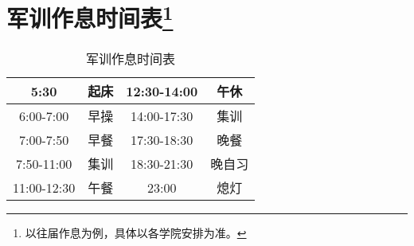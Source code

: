 \section[军训作息时间表]{军训作息时间表\footnote{以往届作息为例，具体以各学院安排为准。}}
\begin{table}[ht]
    \centering
    \begin{tabular}{|c|c|c|c|}
        \hline
        5:30        & 起床 & 12:30-14:00 & 午休  \\
        \hline
        6:00-7:00   & 早操 & 14:00-17:30 & 集训  \\
        \hline
        7:00-7:50   & 早餐 & 17:30-18:30 & 晚餐  \\
        \hline
        7:50-11:00  & 集训 & 18:30-21:30 & 晚自习 \\
        \hline
        11:00-12:30 & 午餐 & 23:00       & 熄灯  \\
        \hline
    \end{tabular}
    \vspace{-0.5em}
    \caption[exercise_time]{军训作息时间表}
\end{table}
